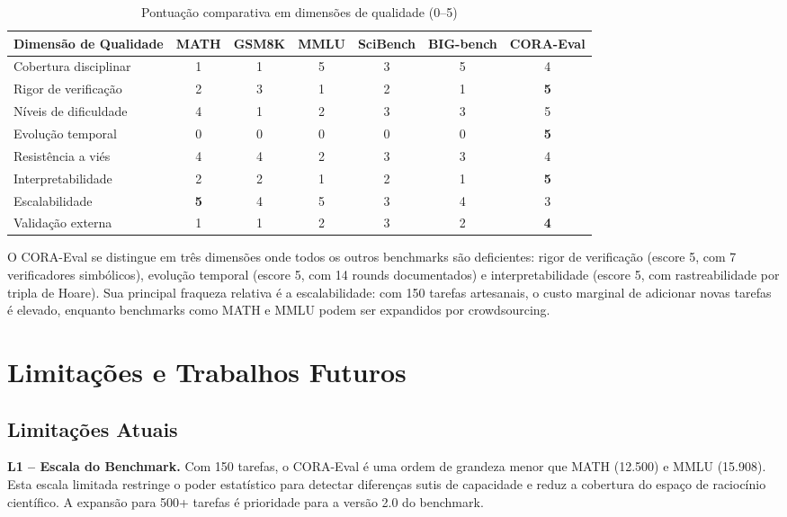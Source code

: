 \begin{table}[H]
\centering
\caption{Pontuação comparativa em dimensões de qualidade (0--5)}
\label{tab:score_comp}
\begin{tabular}{@{}lcccccc@{}}
\toprule
\textbf{Dimensão de Qualidade} & \textbf{MATH} & \textbf{GSM8K} & \textbf{MMLU} & \textbf{SciBench} & \textbf{BIG-bench} & \textbf{CORA-Eval} \\
\midrule
Cobertura disciplinar & 1 & 1 & 5 & 3 & 5 & 4 \\
Rigor de verificação & 2 & 3 & 1 & 2 & 1 & \textbf{5} \\
Níveis de dificuldade & 4 & 1 & 2 & 3 & 3 & 5 \\
Evolução temporal & 0 & 0 & 0 & 0 & 0 & \textbf{5} \\
Resistência a viés & 4 & 4 & 2 & 3 & 3 & 4 \\
Interpretabilidade & 2 & 2 & 1 & 2 & 1 & \textbf{5} \\
Escalabilidade & \textbf{5} & 4 & 5 & 3 & 4 & 3 \\
Validação externa & 1 & 1 & 2 & 3 & 2 & \textbf{4} \\
\bottomrule
\end{tabular}
\end{table}

O CORA-Eval se distingue em três dimensões onde todos os outros benchmarks
são deficientes: rigor de verificação (escore 5, com 7 verificadores
simbólicos), evolução temporal (escore 5, com 14 rounds documentados) e
interpretabilidade (escore 5, com rastreabilidade por tripla de Hoare).
Sua principal fraqueza relativa é a escalabilidade: com 150 tarefas
artesanais, o custo marginal de adicionar novas tarefas é elevado,
enquanto benchmarks como MATH e MMLU podem ser expandidos por crowdsourcing.

\section{Limitações e Trabalhos Futuros}

\subsection{Limitações Atuais}

\textbf{L1 -- Escala do Benchmark.} Com 150 tarefas, o CORA-Eval é uma
ordem de grandeza menor que MATH (12.500) e MMLU (15.908). Esta escala
limitada restringe o poder estatístico para detectar diferenças sutis
de capacidade e reduz a cobertura do espaço de raciocínio científico. A
expansão para 500+ tarefas é prioridade para a versão 2.0 do benchmark.

